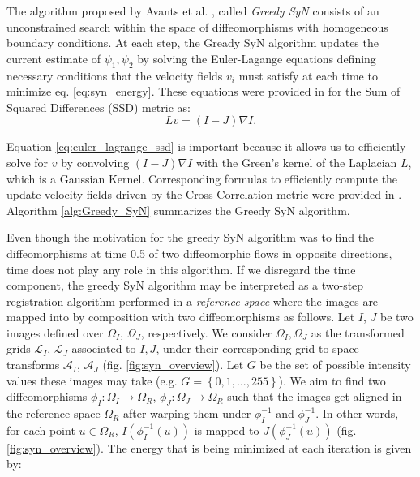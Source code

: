 The algorithm proposed by Avants et al. \cite{Avants2011}, called {\it Greedy SyN} consists of an unconstrained search within the space of diffeomorphisms with homogeneous boundary
conditions. At each step, the Gready SyN algorithm updates the current estimate of $\psi_{1}, \psi_{2}$ by solving the Euler-Lagange equations defining necessary conditions
that the velocity fields $v_{i}$ must satisfy at each time to minimize eq. \ref{eq:syn_energy}. These equations were provided in \cite{Avants2006} for the Sum of Squared
Differences (SSD) metric as:
\begin{equation}\label{eq:euler_lagrange_ssd}
    Lv = (I - J)\nabla I.
\end{equation}

Equation \ref{eq:euler_lagrange_ssd} is important because it allows us to efficiently solve for $v$ by convolving $(I - J)\nabla I$ with the Green's kernel of the Laplacian $L$, which
is a Gaussian Kernel. Corresponding formulas to efficiently compute the update velocity fields driven by the Cross-Correlation metric were provided in \cite{Avants2009}.
Algorithm \ref{alg:Greedy_SyN} summarizes the Greedy SyN algorithm.


Even though the motivation for the greedy SyN algorithm was to find the diffeomorphisms at time 0.5 of two diffeomorphic flows in opposite directions, time does not play
any role in this algorithm. If we disregard the time component, the greedy SyN algorithm may be interpreted as a two-step registration algorithm performed in a
\textit{reference space} where the images are mapped into by composition with two diffeomorphisms as follows. Let $I$, $J$ be two images defined over $\Omega_{I}$, $\Omega_{J}$,
respectively. We consider $\Omega_{I}, \Omega_{J}$ as the transformed grids $\mathcal{L}_{I}$, $\mathcal{L}_{J}$ associated to $I, J$, under their corresponding grid-to-space
transforms $\mathcal{A}_{I}$, $\mathcal{A}_{J}$ (fig. \ref{fig:syn_overview}). Let $G$ be the set of possible intensity values these images may take
(e.g. $G=\left\lbrace 0,1,...,255\right\rbrace$). We aim to find two diffeomorphisms
$\phi_{I}:\Omega_{I}\rightarrow \Omega_{R}$, $\phi_{J}:\Omega_{J}\rightarrow \Omega_{R}$ such that the images get aligned in the reference space $\Omega_{R}$
after warping them under $\phi_{I}^{-1}$ and $\phi_{J}^{-1}$. In other words, for each point $u \in \Omega_{R}$, $I(\phi_{I}^{-1}(u))$ is mapped to $J(\phi_{J}^{-1}(u))$
(fig. \ref{fig:syn_overview}). The energy that is being minimized at each iteration is given by:

